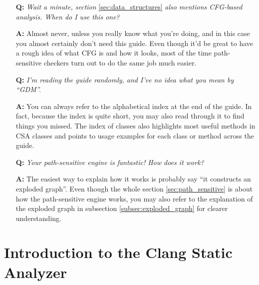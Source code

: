 \documentclass[a4paper,12pt]{article}
\newenvironment{nobr}{\begin{minipage}{\textwidth}\setlength\parskip{1em}
}{\end{minipage}\ignorespacesafterend}
\begin{document}
\begin{nobr}
\begin{itemize}
\item[\textbf{Q:}] \emph{Wait a minute, section} \ref{sec:data_structures} \emph{also mentions CFG-based analysis. When do I use this one?}
\item[\textbf{A:}] Almost never, unless you really know what you're doing, and in this case you almost certainly don't need this guide. Even though it'd be great to have a rough idea of what CFG is and how it looks, most of the time path-sensitive checkers turn out to do the same job much easier.
\end{itemize}
\medskip
\end{nobr}

\begin{nobr}
\begin{itemize}
\item[\textbf{Q:}] \emph{I'm reading the guide randomly, and I've no idea what you mean by ``GDM''.}
\item[\textbf{A:}] You can always refer to the alphabetical index at the end of  the guide. In fact, because the index is quite short, you may also read through it to find things you missed. The index of classes also highlights most useful methods in CSA classes and points to usage examples for each class or method across the guide.
\end{itemize}
\medskip
\end{nobr}

\begin{nobr}
\begin{itemize}
\item[\textbf{Q:}] \emph{Your path-sensitive engine is fantastic! How does it work?}
\item[\textbf{A:}] The easiest way to explain how it works is probably say ``it constructs an exploded graph''. Even though the whole section \ref{sec:path_sensitive} is about how the path-sensitive engine works, you may also refer to the explanation of the exploded graph in subsection \ref{subsec:exploded_graph} for clearer understanding.
\end{itemize}
\medskip
\end{nobr}

\newpage
\section{Introduction to the Clang Static Analyzer}\label{sec:intro}
\end{document}
